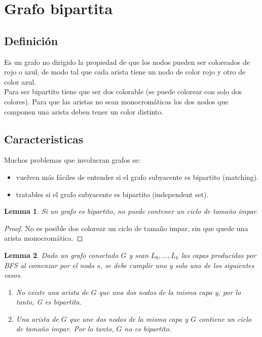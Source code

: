 \documentclass[12pt, fleqn]{article}
\newtheorem{lemma}{Lemma}[section]
\theoremstyle{definition}
\begin{document}
    \section{Grafo bipartita}
        \subsection{Definición}
                    Es un grafo no dirigido la propiedad de que los nodos pueden ser coloreados de rojo o azul, de modo tal
                    que cada arista tiene un nodo de color rojo y otro de color azul.\\
                    Para ser bipartito tiene que ser dos colorable (se puede colorear con solo dos colores). Para que las
                    aristas no sean monocromáticas los dos nodos que componen una arista deben tener un color distinto.
        \subsection{Caracteristicas}
                    Muchos problemas que involucran grafos se:
                    \begin{itemize}
                        \item vuelven más fáciles de entender si el grafo subyacente es bipartito (matching).
                        \item tratables si el grafo subyacente es bipartito (independent set).
                    \end{itemize}
        \begin{lemma}
            Si un grafo es bipartito, no puede contener un ciclo de tamaño impar.
        \end{lemma}
        \begin{proof}
            No es posible dos colorear un ciclo de tamaño impar, sin que quede una arista monocromática.
        \end{proof}
        \begin{lemma}
            Dado un grafo conectado $G$ y sean $L_0, \ldots, L_k$ las capas producidas por BFS al comenzar por
            el nodo $s$, se debe cumplir uno y solo uno de los siguientes casos.
            \begin{enumerate}
                \item No existe una arista de $G$ que una dos nodos de la misma capa y, por lo tanto, G es bipartita.
                \item Una arista de $G$ que une dos nodos de la misma capa y $G$ contiene un ciclo de tamaño impar. Por lo tanto,
                    $G$ no es bipartito.
            \end{enumerate}
        \end{lemma}
\end{document}
